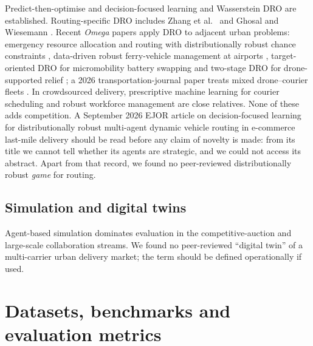 \documentclass[preprint,12pt]{elsarticle}
\begin{document}
Predict-then-optimise and decision-focused learning \cite{Bertsimas2020,Elmachtoub2022} and Wasserstein DRO \cite{MohajerinEsfahani2018,Kuhn2025} are established. Routing-specific DRO includes Zhang et al.\ \cite{Zhang2021} and Ghosal and Wiesemann \cite{GhosalWiesemann2020}. Recent \emph{Omega} papers apply DRO to adjacent urban problems: emergency resource allocation and routing with distributionally robust chance constraints \cite{Wang2023omega}, data-driven robust ferry-vehicle management at airports \cite{Zhang2025ferry}, target-oriented DRO for micromobility battery swapping \cite{Jin2026omega} and two-stage DRO for drone-supported relief \cite{Gao2026omega}; a 2026 transportation-journal paper treats mixed drone--courier fleets \cite{Jin2026tre}. In crowdsourced delivery, prescriptive machine learning for courier scheduling \cite{Behrendt2023} and robust workforce management \cite{Cheng2025} are close relatives. None of these adds competition. A September 2026 EJOR article on decision-focused learning for distributionally robust multi-agent dynamic vehicle routing in e-commerce last-mile delivery \cite{LiuMaMa2026} should be read before any claim of novelty is made: from its title we cannot tell whether its agents are strategic, and we could not access its abstract. Apart from that record, we found no peer-reviewed distributionally robust \emph{game} for routing.

\subsection{Simulation and digital twins}

Agent-based simulation dominates evaluation in the competitive-auction \cite{Figliozzi2007} and large-scale collaboration \cite{Los2025} streams. We found no peer-reviewed ``digital twin'' of a multi-carrier urban delivery market; the term should be defined operationally if used.

\section{Datasets, benchmarks and evaluation metrics}\label{sec:data}
\end{document}
